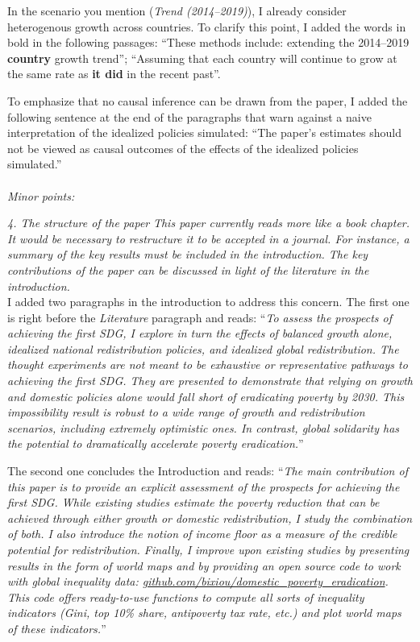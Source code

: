 \documentclass[12pt,english]{article}
\begin{document}
In the scenario you mention (\textit{Trend (2014--2019)}), I already consider heterogenous growth across countries. To clarify this point, I added the words in bold in the following passages: ``These methods include: extending the 2014--2019 \textbf{country} growth trend''; ``Assuming that each country will continue to grow at the same rate as \textbf{it did} in the recent past''. 

To emphasize that no causal inference can be drawn from the paper, I added the following sentence at the end of the paragraphs that warn against a naive interpretation of the idealized policies simulated: ``The paper's estimates should not be viewed as causal outcomes of the effects of the idealized policies simulated.''
~\\ ~\\

\textit{Minor points:}
 
\textit{4.	The structure of the paper}
\textit{This paper currently reads more like a book chapter. It would be necessary to restructure it to be accepted in a journal. For instance, a summary of the key results must be included in the introduction. The key contributions of the paper can be discussed in light of the literature in the introduction.}~\\

I added two paragraphs in the introduction to address this concern. The first one is right before the \textit{Literature} paragraph and reads: ``\textit{To assess the prospects of achieving the first SDG, I explore in turn the effects of balanced growth alone, idealized national redistribution policies, and idealized global redistribution. The thought experiments are not meant to be exhaustive or representative pathways to achieving the first SDG. They are presented to demonstrate that relying on growth and domestic policies alone would fall short of eradicating poverty by 2030. This impossibility result is robust to a wide range of growth and redistribution scenarios, including extremely optimistic ones. In contrast, global solidarity has the potential to dramatically accelerate poverty eradication.}''

The second one concludes the Introduction and reads: ``\textit{The main contribution of this paper is to provide an explicit assessment of the prospects for achieving the first SDG. While existing studies estimate the poverty reduction that can be achieved through either growth or domestic redistribution, I study the combination of both. I also introduce the notion of \textit{income floor} as a measure of the credible potential for redistribution. Finally, I improve upon existing studies by presenting results in the form of world maps and by providing an open source code to work with global inequality data: \href{https://github.com/bixiou/domestic_poverty_eradication}{github.com/bixiou/domestic\_poverty\_eradication}. This code offers ready-to-use functions to compute all sorts of inequality indicators (Gini, top 10\% share, antipoverty tax rate, etc.) and plot world maps of these indicators.}''
~\\ ~\\
\end{document}
